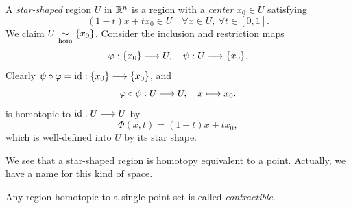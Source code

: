 \begin{example}
    A \emph{star-shaped} region \(U\) in \(\mathbb{R}^n\) is a region with a \emph{center} \(x_0\in U\) satisfying \[
        (1-t)x + tx_0 \in U \quad \forall x\in U,\ \forall t\in[0,1].
    \]
    We claim \(U\underset{\mathrm{hom}}{\sim}\{x_0\}\). Consider the inclusion and restriction maps \[
        \varphi:\{x_0\}\longrightarrow U, \quad \psi:U\longrightarrow\{x_0\}.
    \]
    Clearly \(\psi\circ\varphi = \mathrm{id}:\{x_0\} \longrightarrow \{x_0\}\), and \[
        \varphi\circ\psi : U\longrightarrow U, \quad x\longmapsto x_0.
    \] is homotopic to \(\mathrm{id}:U\longrightarrow U\) by \[
        \Phi(x,t) = (1-t)x + tx_0 ,
    \] which is well-defined into \(U\) by its star shape.
\end{example}

We see that a star-shaped region is homotopy equivalent to a point. Actually, we have a name for this kind of space.

\begin{definition}
    Any region homotopic to a single-point set is called \emph{contractible}.
\end{definition}


